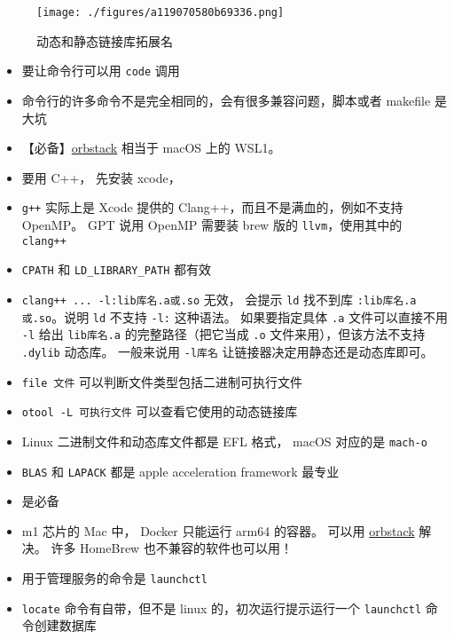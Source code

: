 
\begin{issues}
\issueDraft
\end{issues}

\begin{figure}[ht]
\centering
\texttt{[image: ./figures/a119070580b69336.png]}
\caption{动态和静态链接库拓展名} \label{fig_MacDev_1}
\end{figure}

\begin{itemize}
\item 要让命令行可以用 \verb`code` 调用
\item 命令行的许多命令不是完全相同的，会有很多兼容问题，脚本或者 makefile 是大坑
\item 【必备】\href{https://orbstack.dev/}{orbstack} 相当于 macOS 上的 WSL1。
\item 要用 C++， 先安装 xcode， \item \verb`g++` 实际上是 Xcode 提供的 Clang++，而且不是满血的，例如不支持 OpenMP。 GPT 说用 OpenMP 需要装 brew 版的 \verb`llvm`，使用其中的 \verb`clang++`
\item \verb`CPATH` 和 \verb`LD_LIBRARY_PATH` 都有效
\item \verb`clang++ ... -l:lib库名.a或.so` 无效， 会提示 \verb`ld` 找不到库 \verb`:lib库名.a或.so`。说明 \verb`ld` 不支持 \verb`-l:` 这种语法。 如果要指定具体 \verb`.a` 文件可以直接不用 \verb`-l` 给出 \verb`lib库名.a` 的完整路径（把它当成 \verb`.o` 文件来用），但该方法不支持 \verb`.dylib` 动态库。 一般来说用 \verb`-l库名` 让链接器决定用静态还是动态库即可。
\item \verb`file 文件` 可以判断文件类型包括二进制可执行文件
\item \verb`otool -L 可执行文件` 可以查看它使用的动态链接库
\item Linux 二进制文件和动态库文件都是 EFL 格式， macOS 对应的是 \verb`mach-o`
\item \verb`BLAS` 和 \verb`LAPACK` 都是 apple acceleration framework 最专业
\item {} 是必备
\item m1 芯片的 Mac 中， Docker 只能运行 arm64 的容器。 可以用 \href{https://orbstack.dev/}{orbstack} 解决。 许多 HomeBrew 也不兼容的软件也可以用！
\item 用于管理服务的命令是 \verb`launchctl`
\item \verb`locate` 命令有自带，但不是 linux 的，初次运行提示运行一个 \verb`launchctl` 命令创建数据库
\end{itemize}
